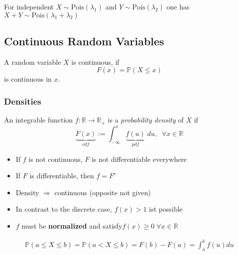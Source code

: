 For independent $X \sim \mathrm{Pois}(\lambda_1)$ and $Y \sim \mathrm{Pois}(\lambda_2)$ one has $X+Y \sim \mathrm{Pois}(\lambda_1 +\lambda_2)$

\subsection{Continuous Random Variables}
A random variable $X$ is continuous, if
\noindent\begin{equation*}
    F(x)=\mathbb{P}(X\leq x)
\end{equation*}
is continuous in $x$.


\subsubsection{Densities}
An integrable function $f:\mathbb{R}\rightarrow\mathbb{R}_+$ is a \textit{probability density} of $X$ if
\noindent\begin{equation*}
    \underbrace{F(x)}_{cdf} := \int_{-\infty}^{x} \underbrace{f(u)}_{pdf}\; du,\;\; \forall x\in \mathbb{R}
\end{equation*}
\begin{itemize}
    \item If $f$ is not continuous, $F$ is not differentiable everywhere
    \item If $F$ is differentiable, then $f = F'$
    \item Density $\Rightarrow$ continuous (opposite not given)
    \item In contrast to the discrete case, $f(x)>1$ ist possible
    \item $f$ must be \textbf{normalized} and satisfy\newline $f(x)\geq 0 \; \forall x\in\mathbb{R}$
\end{itemize}
\noindent\begin{align*}
    \mathbb{P}(a\leq X\leq b)=\mathbb{P}(a<X\leq b)=F(b)-F(a)=\int_a^b f(u)du
\end{align*}
